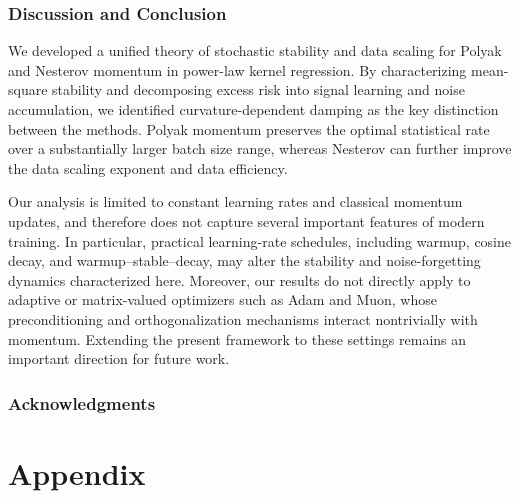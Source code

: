 \documentclass[11pt]{article}
\begin{document}
\section{Discussion and Conclusion}
We developed a unified theory of stochastic stability and data scaling for Polyak and Nesterov momentum in power-law kernel regression. By characterizing mean-square stability
and decomposing excess risk into signal learning and noise accumulation, we identified curvature-dependent damping as the key distinction between the methods. Polyak momentum
preserves the optimal statistical rate over a substantially larger batch size range, whereas Nesterov can further improve the data scaling exponent and
data efficiency. 

Our analysis is limited to constant learning rates and classical momentum updates, and therefore does not capture several important features of modern training. In particular,
practical learning-rate schedules, including warmup, cosine decay, and warmup–stable–decay, may alter the stability and noise-forgetting dynamics characterized here. Moreover,
our results do not directly apply to adaptive or matrix-valued optimizers such as Adam and Muon, whose preconditioning and orthogonalization mechanisms interact nontrivially
with momentum. Extending the present framework to these settings remains an important direction for future work.


\section*{Acknowledgments}





\newpage


\appendix
\part{Appendix}
\parttoc


\end{document}
